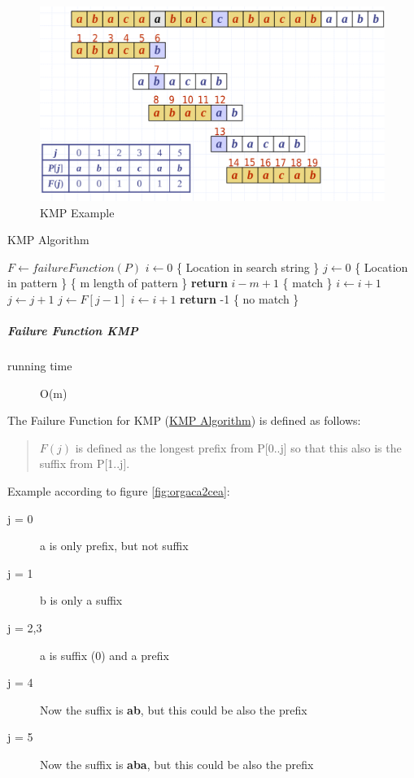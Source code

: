 \documentclass[11pt,twoside,twocolumn,landscape]{article}
\begin{document}
\begin{figure}[htbp]
\centering
\includegraphics[width=.9\linewidth]{img/kmp_example.png}
\caption{\label{fig:orga14932c}KMP Example}
\end{figure}


\begin{algorithm}
  \caption{KMP Algorithm}
  \begin{algorithmic}[1]
    \State $F \leftarrow failureFunction(P)$
    \State $i \leftarrow 0$ \{ Location in search string \}
    \State $j \leftarrow 0$ \{ Location in pattern \}
     \{ m length of pattern \}
    \State \textbf{return} $i - m + 1$ \{ match \}
    \Else
    \State $i \leftarrow i + 1$
    \State $j \leftarrow j + 1$
    \EndIf
    \Else
    \State $j \leftarrow F[j-1]$
    \Else
    \State $i \leftarrow i + 1$
    \EndIf
    \EndIf
    \EndWhile
    \textbf{return} -1 \{ no match \}
    \EndProcedure
  \end{algorithmic}
\end{algorithm}

\subparagraph{Failure Function KMP}
\label{sec:orgdf59cc3}

\begin{description}
\item[{running time}] O(m)
\end{description}


The Failure Function for KMP (\href{../../../roam/20211215172001-kmp_algorithm.org}{KMP Algorithm}) is defined as follows:
\begin{quote}
\(F(j)\) is defined as the longest prefix from P[0..j] so that this also is the suffix from P[1..j].
\end{quote}

Example according to figure \ref{fig:orgaca2cea}:
\begin{description}
\item[{j = 0}] a is only prefix, but not suffix
\item[{j = 1}] b is only a suffix
\item[{j = 2,3}] a is suffix (0) and a prefix
\item[{j = 4}] Now the suffix is \textbf{ab}, but this could be also the prefix
\item[{j = 5}] Now the suffix is \textbf{aba}, but this could be also the prefix
\end{description}
\end{document}
